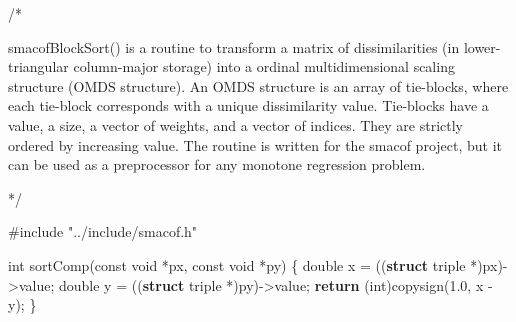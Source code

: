 \documentclass[
  12pt,
  letterpaper,
  DIV=11,
  numbers=noendperiod]{scrreprt}
\newenvironment{Shaded}{\begin{snugshade}}{\end{snugshade}}
\newcommand{\CommentTok}[1]{\textcolor[rgb]{0.37,0.37,0.37}{#1}}
\newcommand{\ControlFlowTok}[1]{\textcolor[rgb]{0.00,0.23,0.31}{\textbf{#1}}}
\newcommand{\DataTypeTok}[1]{\textcolor[rgb]{0.68,0.00,0.00}{#1}}
\newcommand{\FloatTok}[1]{\textcolor[rgb]{0.68,0.00,0.00}{#1}}
\newcommand{\ImportTok}[1]{\textcolor[rgb]{0.00,0.46,0.62}{#1}}
\newcommand{\KeywordTok}[1]{\textcolor[rgb]{0.00,0.23,0.31}{\textbf{#1}}}
\newcommand{\NormalTok}[1]{\textcolor[rgb]{0.00,0.23,0.31}{#1}}
\newcommand{\OperatorTok}[1]{\textcolor[rgb]{0.37,0.37,0.37}{#1}}
\newcommand{\PreprocessorTok}[1]{\textcolor[rgb]{0.68,0.00,0.00}{#1}}
\theoremstyle{remark}
\begin{document}
\begin{Shaded}
\begin{Highlighting}[]
\CommentTok{/*}

\CommentTok{smacofBlockSort() is a routine to transform a matrix of dissimilarities (in}
\CommentTok{lower{-}triangular column{-}major storage) into a ordinal multidimensional scaling}
\CommentTok{structure (OMDS structure). An OMDS structure is an array of tie{-}blocks, where}
\CommentTok{each tie{-}block corresponds with a unique dissimilarity value. Tie{-}blocks have a}
\CommentTok{value, a size, a vector of weights, and a vector of indices. They are strictly }
\CommentTok{ordered by increasing value. The routine is written for the smacof project, }
\CommentTok{but it can be used as a preprocessor for any monotone regression problem.}

\CommentTok{*/}

\PreprocessorTok{\#include }\ImportTok{"../include/smacof.h"}


\DataTypeTok{int}\NormalTok{ sortComp}\OperatorTok{(}\DataTypeTok{const} \DataTypeTok{void} \OperatorTok{*}\NormalTok{px}\OperatorTok{,} \DataTypeTok{const} \DataTypeTok{void} \OperatorTok{*}\NormalTok{py}\OperatorTok{)} \OperatorTok{\{}
    \DataTypeTok{double}\NormalTok{ x }\OperatorTok{=} \OperatorTok{((}\KeywordTok{struct}\NormalTok{ triple }\OperatorTok{*)}\NormalTok{px}\OperatorTok{){-}\textgreater{}}\NormalTok{value}\OperatorTok{;}
    \DataTypeTok{double}\NormalTok{ y }\OperatorTok{=} \OperatorTok{((}\KeywordTok{struct}\NormalTok{ triple }\OperatorTok{*)}\NormalTok{py}\OperatorTok{){-}\textgreater{}}\NormalTok{value}\OperatorTok{;}
    \ControlFlowTok{return} \OperatorTok{(}\DataTypeTok{int}\OperatorTok{)}\NormalTok{copysign}\OperatorTok{(}\FloatTok{1.0}\OperatorTok{,}\NormalTok{ x }\OperatorTok{{-}}\NormalTok{ y}\OperatorTok{);}
\OperatorTok{\}}


\end{Highlighting}
\end{Shaded}
\end{document}
